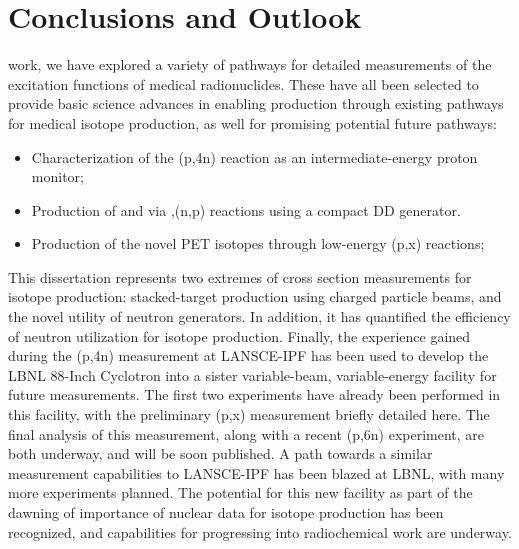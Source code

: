 \chapter{Conclusions and Outlook}

 work, we have explored a variety of pathways for detailed measurements of the excitation functions of medical radionuclides. 
These have all been selected to provide basic science advances in enabling production through  existing pathways for medical isotope production, as well for promising potential future pathways:
\begin{itemize}
 \item Characterization of the (p,4n) reaction as an intermediate-energy proton monitor;
 \item Production of   and  via ,(n,p) reactions using a compact DD generator.
  \item Production of the   novel PET isotopes through low-energy (p,x) reactions;
\end{itemize}

This dissertation represents  two extremes of cross section measurements for isotope production: stacked-target production using charged particle beams, and the novel utility of neutron generators.
In addition, it has quantified the efficiency of  neutron utilization for isotope production.
Finally, the experience gained during the (p,4n)  measurement at LANSCE-IPF has been used to develop the LBNL 88-Inch Cyclotron into a  sister variable-beam, variable-energy facility for future measurements.
The first two experiments have already been performed in this facility, with the preliminary (p,x) measurement briefly detailed here.
The final analysis of this measurement, along with a recent (p,6n) experiment, are both underway, and will be soon published.
A path towards a similar measurement capabilities to LANSCE-IPF has been blazed at LBNL, with many more experiments planned.
The potential for this new facility as part of the dawning of importance of nuclear data for isotope production has been recognized, and capabilities for progressing into radiochemical work are underway.

